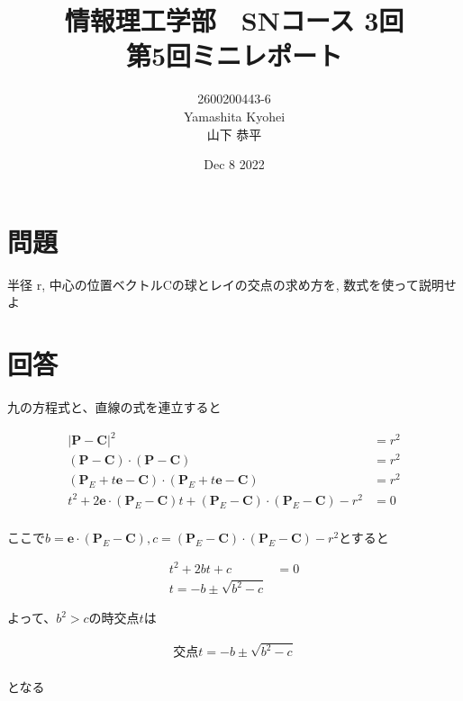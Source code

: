\documentclass[dvipdfmx,autodetect-engine,titlepage]{jsarticle}
\title{情報理工学部　SNコース 3回\\
第5回ミニレポート\\}
\author{2600200443-6\\Yamashita Kyohei\\山下 恭平}
\date{Dec 8 2022}
\begin{document}
\maketitle

\section*{問題}
半径 r, 中心の位置ベクトルCの球とレイの交点の求め方を,
数式を使って説明せよ

\section*{回答}

九の方程式と、直線の式を連立すると

\begin{align*}
  | \mathbf{P} -\mathbf{C}  \vert ^2 &= r^2\\
  (\mathbf{P} -\mathbf{C} )\cdot (\mathbf{P} -\mathbf{C} ) &= r^2 \\
  (\mathbf{P} _E + t\mathbf{e} - \mathbf{C}) \cdot (\mathbf{P} _E + t\mathbf{e} - \mathbf{C}) &= r^2\\
  t^2 + 2\mathbf{e}\cdot(\mathbf{P}_E - \mathbf{C})t + (\mathbf{P}_E - \mathbf{C})\cdot(\mathbf{P}_E - \mathbf{C}) - r^2 &= 0\\
\end{align*}

ここで\begin{math}b = \mathbf{e}\cdot(\mathbf{P}_E - \mathbf{C}) , c = (\mathbf{P}_E - \mathbf{C})\cdot(\mathbf{P}_E - \mathbf{C}) - r^2\end{math}とすると

\begin{align*}
  t^2 + 2bt + c &= 0\\
  t = -b \pm \sqrt{b^2 - c}
\end{align*}

よって、\begin{math}b^2>c\end{math}の時交点\begin{math}t\end{math}は

\begin{align*}
  交点t = -b \pm \sqrt{b^2 - c}\\
\end{align*}

となる
\end{document}

